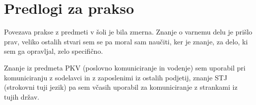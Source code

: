 \newpage
\section{Predlogi za prakso}
    Povezava prakse z predmeti v šoli je bila zmerna.
    Znanje o varnemu delu je prišlo prav, veliko ostalih stvari
    sem se pa moral sam naučiti, ker je znanje, za delo,
    ki sem ga opravljal, zelo specifično.

    Znanje iz predmeta PKV (poslovno komuniciranje in vodenje)
    sem uporabil pri komuniciranju z sodelavci in z zaposlenimi
    iz ostalih podjetij, znanje STJ (strokovni tuji jezik)
    pa sem včasih uporabil za komuniciranje z strankami iz tujih držav.